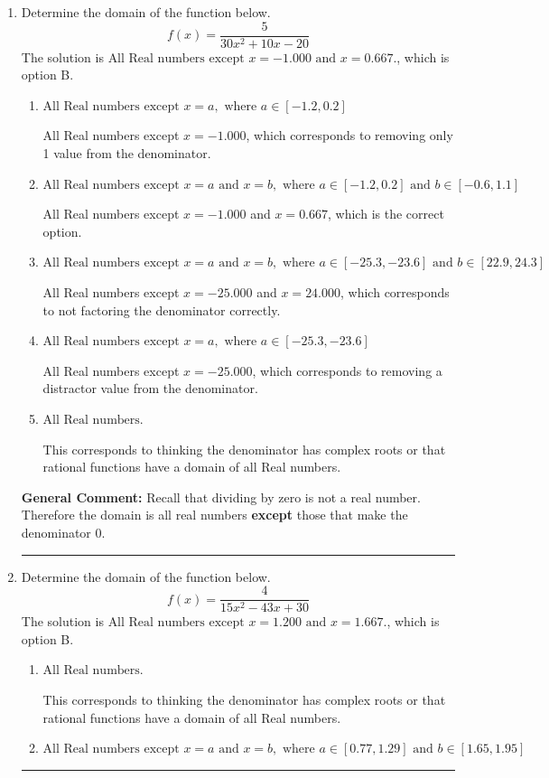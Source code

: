 \documentclass{extbook}[14pt]
\newcommand{\litem}[1]{\item #1

\rule{\textwidth}{0.4pt}}
\begin{document}
\begin{enumerate}\litem{
Determine the domain of the function below.
\[ f(x) = \frac{5}{30x^{2} +10 x -20} \]
The solution is \( \text{All Real numbers except } x = -1.000 \text{ and } x = 0.667. \), which is option B.\begin{enumerate}[label=\Alph*.]
\item \( \text{All Real numbers except } x = a, \text{ where } a \in [-1.2, 0.2] \)

All Real numbers except $x = -1.000$, which corresponds to removing only 1 value from the denominator.
\item \( \text{All Real numbers except } x = a \text{ and } x = b, \text{ where } a \in [-1.2, 0.2] \text{ and } b \in [-0.6, 1.1] \)

All Real numbers except $x = -1.000$ and $x = 0.667$, which is the correct option.
\item \( \text{All Real numbers except } x = a \text{ and } x = b, \text{ where } a \in [-25.3, -23.6] \text{ and } b \in [22.9, 24.3] \)

All Real numbers except $x = -25.000$ and $x = 24.000$, which corresponds to not factoring the denominator correctly.
\item \( \text{All Real numbers except } x = a, \text{ where } a \in [-25.3, -23.6] \)

All Real numbers except $x = -25.000$, which corresponds to removing a distractor value from the denominator.
\item \( \text{All Real numbers.} \)

This corresponds to thinking the denominator has complex roots or that rational functions have a domain of all Real numbers.
\end{enumerate}

\textbf{General Comment:} Recall that dividing by zero is not a real number. Therefore the domain is all real numbers \textbf{except} those that make the denominator 0.
}
\litem{
Determine the domain of the function below.
\[ f(x) = \frac{4}{15x^{2} -43 x + 30} \]
The solution is \( \text{All Real numbers except } x = 1.200 \text{ and } x = 1.667. \), which is option B.\begin{enumerate}[label=\Alph*.]
\item \( \text{All Real numbers.} \)

This corresponds to thinking the denominator has complex roots or that rational functions have a domain of all Real numbers.
\item \( \text{All Real numbers except } x = a \text{ and } x = b, \text{ where } a \in [0.77, 1.29] \text{ and } b \in [1.65, 1.95] \)


\end{enumerate}}
\end{enumerate}
\end{document}
